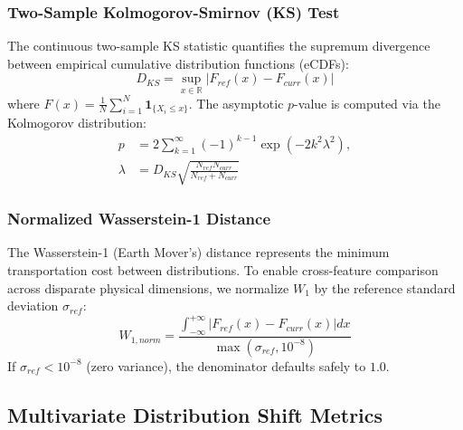 \documentclass[conference]{IEEEtran}
\begin{document}
\subsubsection{Two-Sample Kolmogorov-Smirnov (KS) Test}
The continuous two-sample KS statistic quantifies the supremum divergence between empirical cumulative distribution functions (eCDFs):
\begin{equation}
D_{KS} = \sup_{x \in \mathbb{R}} |F_{ref}(x) - F_{curr}(x)|
\end{equation}
where $F(x) = \frac{1}{N} \sum_{i=1}^N \mathbf{1}_{\{X_i \le x\}}$. The asymptotic $p$-value is computed via the Kolmogorov distribution:
\begin{equation}
\begin{aligned}
p &= 2 \sum_{k=1}^\infty (-1)^{k-1} \exp\left( -2 k^2 \lambda^2 \right), \\
\lambda &= D_{KS} \sqrt{\frac{N_{ref} N_{curr}}{N_{ref} + N_{curr}}}
\end{aligned}
\end{equation}

\subsubsection{Normalized Wasserstein-1 Distance}
The Wasserstein-1 (Earth Mover's) distance represents the minimum transportation cost between distributions. To enable cross-feature comparison across disparate physical dimensions, we normalize $W_1$ by the reference standard deviation $\sigma_{ref}$:
\begin{equation}
W_{1, norm} = \frac{\int_{-\infty}^{+\infty} |F_{ref}(x) - F_{curr}(x)| dx}{\max(\sigma_{ref}, 10^{-8})}
\end{equation}
If $\sigma_{ref} < 10^{-8}$ (zero variance), the denominator defaults safely to $1.0$.

\subsection{Multivariate Distribution Shift Metrics}
\end{document}
